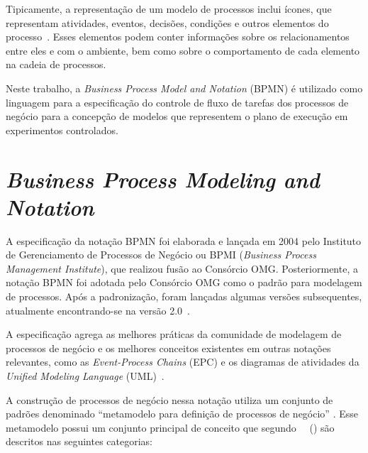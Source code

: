 Tipicamente, a representação de um modelo de processos inclui ícones, que representam atividades, eventos, decisões, condições e outros elementos do processo~\cite{brazil2011bpm}. Esses elementos podem conter informações sobre os relacionamentos entre eles e com o ambiente, bem como sobre o comportamento de cada elemento na cadeia de processos.

Neste trabalho, a \textit{Business Process Model and Notation} (BPMN) é utilizado como linguagem para a especificação do controle de fluxo de tarefas dos processos de negócio para a concepção de modelos que representem o plano de execução em experimentos controlados.

\section{\textit{Business Process Modeling and Notation}}

A especificação da notação BPMN foi elaborada e lançada em 2004 pelo Instituto de Gerenciamento de Processos de Negócio ou BPMI (\textit{Business Process Management Institute}), que realizou fusão ao Consórcio OMG. Posteriormente, a notação BPMN foi adotada pelo Consórcio OMG como o padrão para modelagem de processos. Após a padronização, foram lançadas algumas versões subsequentes, atualmente encontrando-se na versão 2.0~\cite{object2016business}.

A especificação agrega as melhores práticas da comunidade de modelagem de processos de negócio e os melhores conceitos existentes em outras notações relevantes, como as \textit{Event-Process Chains} (EPC) e os diagramas de atividades da \textit{Unified Modeling Language} (UML)~\cite{braghetto2011tecnicas}.

A construção de processos de negócio nessa notação utiliza um conjunto de padrões denominado ``metamodelo para definição de processos de negócio'' \cite{object2016business}. Esse metamodelo possui um conjunto principal de conceito que segundo ~~(\citeyear{Weske2012}) são descritos nas seguintes categorias:


